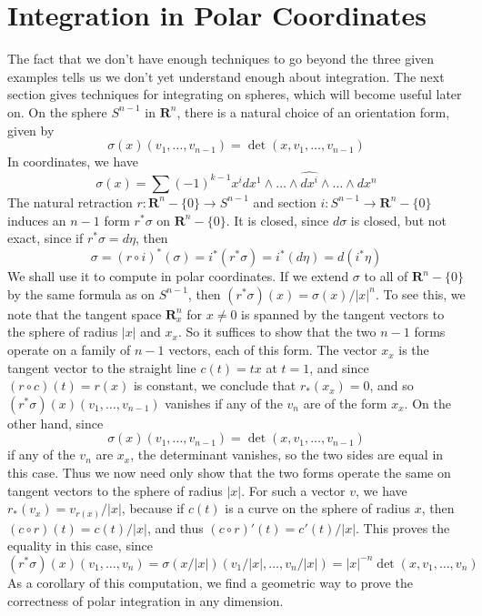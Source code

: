 \section{Integration in Polar Coordinates}

The fact that we don't have enough techniques to go beyond the three given examples tells us we don't yet understand enough about integration. The next section gives techniques for integrating on spheres, which will become useful later on. On the sphere $S^{n-1}$ in $\mathbf{R}^n$, there is a natural choice of an orientation form, given by
%
\[ \sigma(x)(v_1, \dots, v_{n-1}) = \det(x,v_1, \dots,v_{n-1}) \]
%
In coordinates, we have
%
\[ \sigma(x) = \sum (-1)^{k-1} x^i dx^1 \wedge \dots \wedge \widehat{dx^i} \wedge \dots \wedge dx^n \]
%
The natural retraction $r: \mathbf{R}^n - \{ 0 \} \to S^{n-1}$ and section $i: S^{n-1} \to \mathbf{R}^n - \{ 0 \}$ induces an $n-1$ form $r^* \sigma$ on $\mathbf{R}^n - \{ 0 \}$. It is closed, since $d\sigma$ is closed, but not exact, since if $r^* \sigma = d \eta$, then
%
\[ \sigma = (r \circ i)^*(\sigma) = i^*(r^* \sigma) = i^*(d \eta) = d(i^* \eta) \]
%
We shall use it to compute in polar coordinates. If we extend $\sigma$ to all of $\mathbf{R}^n - \{ 0 \}$ by the same formula as on $S^{n-1}$, then $(r^* \sigma)(x) = \sigma(x) / |x|^n$. To see this, we note that the tangent space $\mathbf{R}^n_x$ for $x \neq 0$ is spanned by the tangent vectors to the sphere of radius $|x|$ and $x_x$. So it suffices to show that the two $n-1$ forms operate on a family of $n-1$ vectors, each of this form. The vector $x_x$ is the tangent vector to the straight line $c(t) = tx$ at $t = 1$, and since $(r \circ c)(t) = r(x)$ is constant, we conclude that $r_*(x_x) = 0$, and so $(r^* \sigma)(x)(v_1, \dots, v_{n-1})$ vanishes if any of the $v_n$ are of the form $x_x$. On the other hand, since
%
\[ \sigma(x)(v_1, \dots, v_{n-1}) = \det(x,v_1, \dots, v_{n-1}) \]
%
if any of the $v_n$ are $x_x$, the determinant vanishes, so the two sides are equal in this case. Thus we now need only show that the two forms operate the same on tangent vectors to the sphere of radius $|x|$. For such a vector $v$, we have $r_*(v_x) = v_{r(x)}/|x|$, because if $c(t)$ is a curve on the sphere of radius $x$, then $(c \circ r)(t) = c(t)/|x|$, and thus $(c \circ r)'(t) = c'(t)/|x|$. This proves the equality in this case, since
%
\[ (r^* \sigma)(x)(v_1, \dots, v_n) = \sigma(x/|x|)(v_1/|x|, \dots, v_n/|x|) = |x|^{-n} \det(x,v_1, \dots, v_n) \]
%
As a corollary of this computation, we find a geometric way to prove the correctness of polar integration in any dimension.

